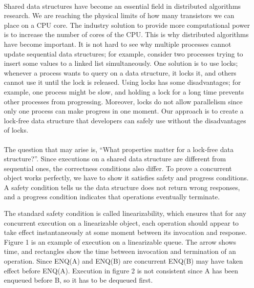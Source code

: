 \documentclass[12pt]{article}
\begin{document}
\pagebreak

\paragraph{}
Shared data structures have become an essential field in distributed algorithms research.
We are reaching the physical limits of how many transistors we can place on a CPU core. The industry solution to provide more computational power is to increase the number of cores of the CPU. This is why distributed algorithms have become important. It is not hard to see why multiple processes cannot update sequential data structures; for example, consider two processes trying to insert some values to a linked list simultaneously. One solution is to use locks; whenever a process wants to query on a data structure, it locks it, and others cannot use it until the lock is released. Using locks has some disadvantages; for example, one process might be slow, and holding a lock for a long time prevents other processes from progressing. Moreover, locks do not allow parallelism since only one process can make progress in one moment. Our approach is to create a lock-free data structure that developers can safely use without the disadvantages of locks.

\paragraph{}
The question that may arise is, ``What properties matter for a lock-free data structure?''.
Since executions on a shared data structure are different from sequential ones, the correctness conditions also differ. To prove a concurrent object works perfectly, we have to show it satisfies safety and progress conditions. A safety condition tells us the data structure does not return wrong responses, and a progress condition indicates that operations eventually terminate.

The standard safety condition is called linearizability, which ensures that for any concurrent execution on a linearizable object, each operation should appear to take effect instantaneously at some moment between its invocation and response. Figure 1 is an example of execution on a linearizable queue. The arrow shows time, and rectangles show the time between invocation and termination of an operation. Since ENQ(A) and ENQ(B) are concurrent ENQ(B) may have taken effect before ENQ(A). Execution in figure 2 is not consistent since A has been enqueued before B, so it has to be dequeued first.
\end{document}
